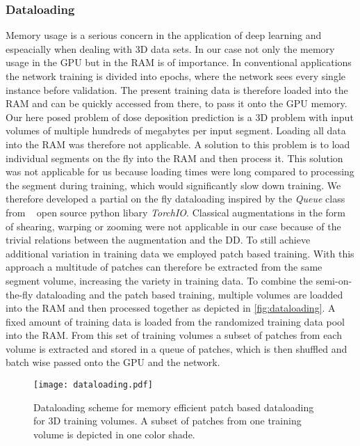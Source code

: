 \subsubsection{Dataloading}

Memory usage is a serious concern in the application of deep learning and espeacially when dealing with 3D data sets. 
In our case not only the memory usage in the \ac{GPU} but in the \ac{RAM} is of importance. 
In conventional applications the network training is divided into epochs, where the network sees every single instance before validation.
The present training data is therefore loaded into the \acs{RAM} and can be quickly accessed from there, to pass it onto the \acs{GPU} memory.
Our here posed problem of dose deposition prediction is a 3D problem with input volumes of multiple hundreds of megabytes per input segment.
Loading all data into the \acs{RAM} was therefore not applicable. 
A solution to this problem is to load individual segments on the fly into the RAM and then process it.
This solution was not applicable for us because loading times were long compared to processing the segment during training, which would significantly slow down training.
We therefore developed a partial on the fly dataloading inspired by the \emph{Queue} class from \citeauthor{perez-garcia_torchio_2021}~\cite{perez-garcia_torchio_2021} open source python libary \emph{TorchIO}.
Classical augmentations in the form of shearing, warping or zooming were not applicable in our case because of the trivial relations between the augmentation and the \acs{DD}.
To still achieve additional variation in training data we employed patch based training. 
With this approach a multitude of patches can therefore be extracted from the same segment volume, increasing the variety in training data.
To combine the semi-on-the-fly dataloading and the patch based training, multiple volumes are loadded into the RAM and then processed together as depicted in \autoref{fig:dataloading}. 
A fixed amount of training data is loaded from the randomized training data pool into the \acs{RAM}. 
From this set of training volumes a subset of patches from each volume is extracted and stored in a queue of patches, which is then shuffled and batch wise passed onto the \acs{GPU} and the network. 

\begin{figure}
    \centering
    \texttt{[image: dataloading.pdf]}
    \caption{Dataloading scheme for memory efficient patch based dataloading for 3D training volumes. A subset of patches from one training volume is depicted in one color shade.}\label{fig:dataloading}
\end{figure}

